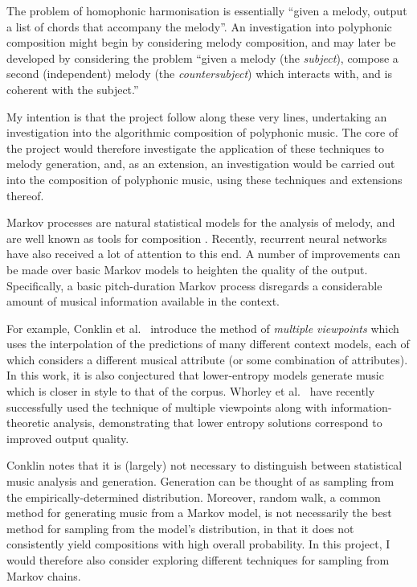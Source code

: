 \documentclass[12pt,a4paper,twoside]{article}
\begin{document}
The problem of homophonic harmonisation is essentially ``given a melody, output a list of chords that accompany the melody''. An investigation into polyphonic composition might begin by considering melody composition, and may later be developed by considering the problem ``given a melody (the \emph{subject}), compose a second (independent) melody (the \emph{countersubject}) which interacts with, and is coherent with the subject.''

My intention is that the project follow along these very lines, undertaking an investigation into the algorithmic composition of polyphonic music. The core of the project would therefore investigate the application of these techniques to melody generation, and, as an extension, an investigation would be carried out into the composition of polyphonic music, using these techniques and extensions thereof.

Markov processes are natural statistical models for the analysis of melody, and are well known as tools for composition \cite{ames1989markov}. Recently, recurrent neural networks have also received a lot of attention to this end. A number of improvements can be made over basic Markov models to heighten the quality of the output. Specifically, a basic pitch-duration Markov process disregards a considerable amount of musical information available in the context. 

For example, Conklin et al.\ \cite{conklin1995viewpoints} introduce the method of \emph{multiple viewpoints} which uses the interpolation of the predictions of many different context models, each of which considers a different musical attribute (or some combination of attributes). In this work, it is also conjectured that lower-entropy models generate music which is closer in style to that of the corpus. Whorley et al.\ \cite{whorley2016music} have recently successfully used the technique of multiple viewpoints along with information-theoretic analysis, demonstrating that lower entropy solutions correspond to improved output quality.

Conklin \cite{conklin2003music} notes that it is (largely) not necessary to distinguish between statistical music analysis and generation. Generation can be thought of as sampling from the empirically-determined distribution. Moreover, random walk, a common method for generating music from a Markov model, is not necessarily the best method for sampling from the model's distribution, in that it does not consistently yield compositions with high overall probability. In this project, I would therefore also consider exploring different techniques for sampling from Markov chains.
\end{document}
